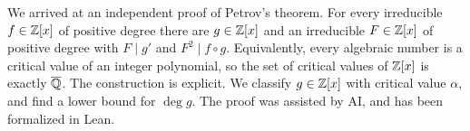 We arrived at an independent proof of Petrov's theorem. For every
irreducible $f \in \mathbb{Z}[x]$ of positive degree there are $g \in \mathbb{Z}[x]$ and an
irreducible $F \in \mathbb{Z}[x]$ of positive degree with $F \mid g'$ and
$F^{2} \mid f \circ g$. Equivalently, every algebraic number is a critical
value of an integer polynomial, so the set of critical values of $\mathbb{Z}[x]$ is
exactly $\overline{\mathbb{Q}}$. The construction is explicit. We classify
$g \in \mathbb{Z}[x]$ with critical value $\alpha$, and find a lower bound for
$\deg g$. The proof was assisted by AI, and has been formalized in Lean.
